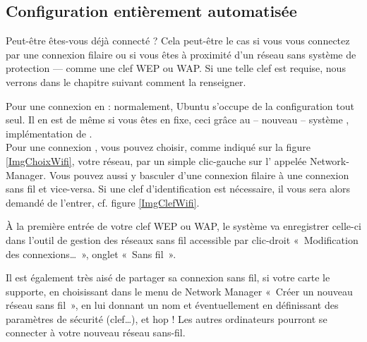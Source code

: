\subsection{Configuration entièrement automatisée}
\label{RefUtilisationNM}
Peut-être êtes-vous déjà connecté ? Cela peut-être le cas si vous vous connectez par une connexion filaire ou si vous êtes à proximité d'un réseau  sans système de protection --- comme une clef WEP ou WAP. Si une telle clef est requise, nous verrons dans le chapitre suivant comment la renseigner.\par
Pour une connexion  en  : normalement, Ubuntu s'occupe de la configuration tout seul. Il en est de même si vous êtes en  fixe, ceci grâce au -- nouveau -- système , implémentation de .\\
Pour une connexion , vous pouvez choisir, comme indiqué sur la figure \ref{ImgChoixWifi}, votre réseau, par un simple clic-gauche sur l' appelée Network-Manager. Vous pouvez aussi y basculer d'une connexion filaire à une connexion sans fil et vice-versa. Si une clef d'identification est nécessaire, il vous sera alors demandé de l'entrer, cf. figure \ref{ImgClefWifi}.\par
À la première entrée de votre clef WEP ou WAP, le système va enregistrer celle-ci dans l'outil de gestion des réseaux sans fil accessible par clic-droit «~Modification des connexions\ldots{}~», onglet «~Sans fil~».\par
\ReseauNM
Il est également très aisé de partager sa connexion sans fil, si votre carte  le supporte, en choisissant dans le menu de Network Manager «~Créer un nouveau réseau sans fil~», en lui donnant un nom et éventuellement en définissant des paramètres de sécurité (clef\ldots{}), et hop ! Les autres ordinateurs pourront se connecter à votre nouveau réseau sans-fil.

